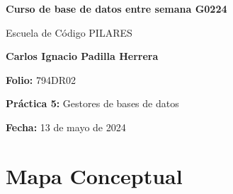 \documentclass{article}
\begin{document}
\begin{titlepage}
  \centering
  \vspace*{1cm}
  \Huge\textbf{Curso de base de datos entre semana G0224}
  
  \vspace{0.5cm}
  \LARGE Escuela de Código PILARES
  
  \vspace{1.5cm}
  \textbf{Carlos Ignacio Padilla Herrera}
  
  \vspace{2cm}
  \Large\textbf{Folio:} 794DR02
  
  \vspace{0.5cm}
  \Large\textbf{Práctica 5:} Gestores de bases de datos
  
  \vfill
  
  \Large\textbf{Fecha:} 13 de mayo de 2024
  
  \vspace{0.8cm}
\end{titlepage}

\newpage %

\section{Mapa Conceptual}
\end{document}
